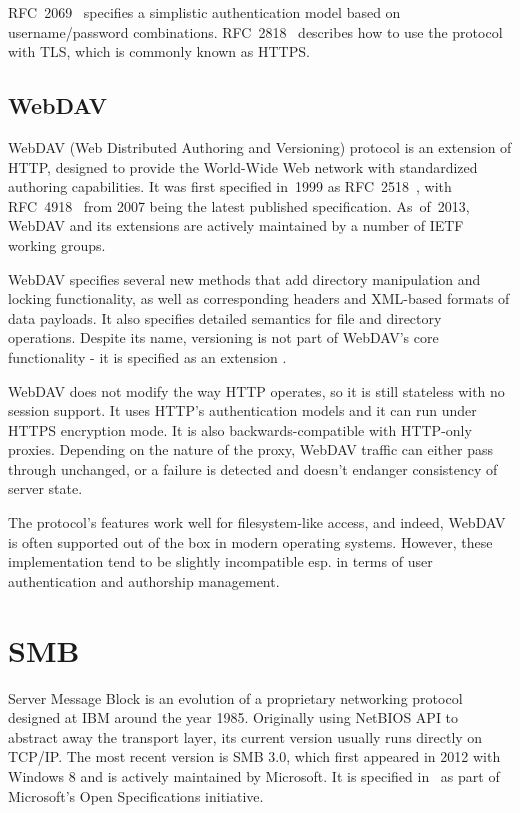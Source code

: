 RFC~2069~\cite{rfc2069} specifies a simplistic authentication model based on username/password combinations.
RFC~2818~\cite{rfc2818} describes how to use the protocol with TLS, which is commonly known as HTTPS.

\subsection{WebDAV}

WebDAV (Web Distributed Authoring and Versioning) protocol is an extension of HTTP, designed to provide the
World-Wide Web network with standardized authoring capabilities. It was first specified in~1999 as
RFC~2518~\cite{rfc2518}, with RFC~4918~\cite{rfc4918} from 2007 being the latest published specification.
As~of~2013, WebDAV and its extensions are actively maintained by a number of IETF working groups.

WebDAV specifies several new methods that add directory manipulation and locking functionality, as well as
corresponding headers and XML-based formats of data payloads. It also specifies detailed semantics for file
and directory operations. Despite its name, versioning is not part of WebDAV's core functionality - it is
specified as an extension \cite{rfc3253}.

WebDAV does not modify the way HTTP operates, so it is still stateless with no session support. It uses HTTP's
authentication models and it can run under HTTPS encryption mode. It is also backwards-compatible with
HTTP-only proxies. Depending on the nature of the proxy, WebDAV traffic can either pass through unchanged, or
a failure is detected and doesn't endanger consistency of server state.

The protocol's features work well for filesystem-like access, and indeed, WebDAV is often supported out of the
box in modern operating systems. However, these implementation tend to be slightly incompatible esp. in terms
of user authentication and authorship management.

\section{SMB}

Server Message Block is an evolution of a proprietary networking protocol designed at IBM around the year
1985. Originally using NetBIOS API to abstract away the transport layer, its current version usually runs
directly on TCP/IP.  The most recent version is SMB 3.0, which first appeared in 2012 with Windows 8 and is
actively maintained by Microsoft. It is specified in~\cite{mssmb2} as part of Microsoft's Open Specifications
initiative.

